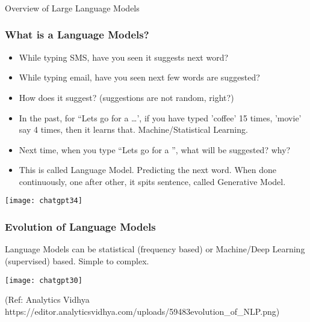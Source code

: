 \begin{frame}[fragile]\frametitle{}
\begin{center}
{\Large Overview of Large Language Models}
\end{center}
\end{frame}

\begin{frame}[fragile]\frametitle{What is a Language Models?}

\begin{itemize}
\item While typing SMS, have you seen it suggests next word?
\item While typing email, have you seen next few words are suggested?
\item How does it suggest? (suggestions are not random, right?)
\item In the past, for ``Lets go for a \ldots', if you have typed 'coffee' 15 times, 'movie' say 4 times, then it learns that. Machine/Statistical Learning.
\item Next time, when you type ``Lets go for a '', what will be suggested? why?
\item This is called Language Model. Predicting the next word. When done continuously, one after other, it spits sentence, called Generative Model.
\end{itemize}	

\begin{center}
\texttt{[image: chatgpt34]}
\end{center}		

\end{frame}

\begin{frame}[fragile]\frametitle{Evolution of Language Models}

Language Models can be statistical (frequency based) or Machine/Deep Learning (supervised) based. Simple to complex.

\begin{center}
\texttt{[image: chatgpt30]}
\end{center}				
{\tiny (Ref: Analytics Vidhya https://editor.analyticsvidhya.com/uploads/59483evolution\_of\_NLP.png)}

\end{frame}

